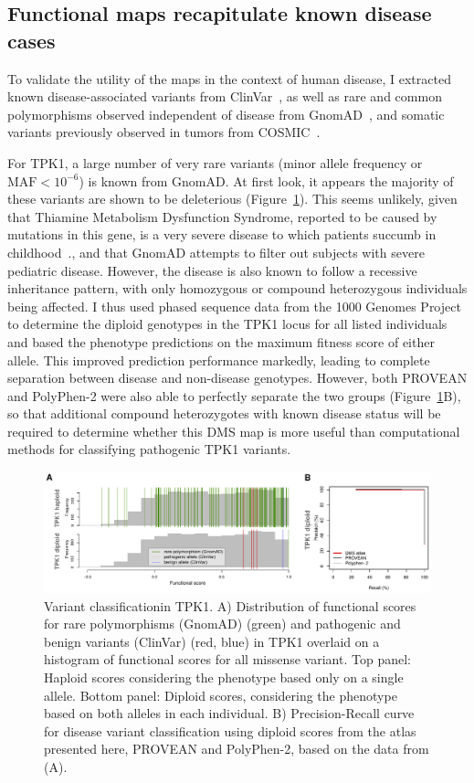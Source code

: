 \subsection{Functional maps recapitulate known disease cases}

To validate the utility of the maps in the context of human disease, I extracted known disease-associated variants from ClinVar~\cite{landrum_clinvar:_2016}, as well as rare and common polymorphisms observed independent of disease from GnomAD~\cite{lek_analysis_2016}, and somatic variants previously observed in tumors from COSMIC~\cite{forbes_cosmic:_2001}. 

For TPK1, a large number of very rare variants (minor allele frequency or $\text{MAF} < 10^{-6}$) is known from GnomAD. At first look, it appears the majority of these variants are shown to be deleterious (Figure~\ref{fig:tpk1_diploid}). This seems unlikely, given that Thiamine Metabolism Dysfunction Syndrome, reported to be caused by mutations in this gene, is a very severe disease to which patients succumb in childhood~\cite{mayr_thiamine_2011}., and that GnomAD attempts to filter out subjects with severe pediatric disease. However, the disease is also known to follow a recessive inheritance pattern, with only homozygous or compound heterozygous individuals being affected. I thus used phased sequence data from the 1000 Genomes Project~\cite{the_1000_genomes_project_consortium_global_2015} to determine the diploid genotypes in the TPK1 locus for all listed individuals and based the phenotype predictions on the maximum fitness score of either allele. This improved prediction performance markedly, leading to complete separation between disease and non-disease genotypes. However, both PROVEAN and PolyPhen-2 were also able to perfectly separate the two groups (Figure~\ref{fig:tpk1_diploid}B), so that additional compound heterozygotes with known disease status will be required to determine whether this DMS map is more useful than computational methods for classifying pathogenic TPK1 variants. 

\begin{figure}[h!]
	\centering
	\includegraphics[width=\textwidth]{img/diploid.pdf}
	\caption{Variant classificationin TPK1. A) Distribution of functional scores for rare polymorphisms (GnomAD) (green) and pathogenic and benign variants (ClinVar) (red, blue) in TPK1 overlaid on a histogram of functional scores for all missense variant. Top panel: Haploid scores considering the phenotype based only on a single allele. Bottom panel: Diploid scores, considering the phenotype based on both alleles in each individual. B) Precision-Recall curve for disease variant classification using diploid scores from the atlas presented here, PROVEAN and PolyPhen-2, based on the data from (A).}
	\label{fig:tpk1_diploid}
\end{figure}


